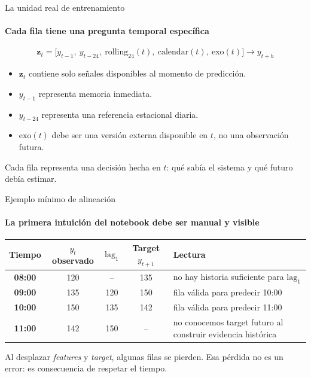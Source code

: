 \documentclass[aspectratio=169,11pt]{beamer}  %
\newcommand{\hrow}{\rowcolor{mlcream}}
\begin{document}

\begin{frame}{La unidad real de entrenamiento}
\framesubtitle{Cada fila tiene una pregunta temporal específica}
{\Large\[ \mathbf{z}_t = \bigl[y_{t-1},\ y_{t-24},\ \mathrm{rolling}_{24}(t),\ \mathrm{calendar}(t),\ \mathrm{exo}(t)\bigr] \longrightarrow y_{t+h} \]}
\begin{itemize}
\item $\mathbf{z}_t$ contiene solo señales disponibles al momento de predicción.
\item $y_{t-1}$ representa memoria inmediata.
\item $y_{t-24}$ representa una referencia estacional diaria.
\item $\mathrm{exo}(t)$ debe ser una versión externa disponible en $t$, no una observación futura.
\end{itemize}
Cada fila representa una decisión hecha en $t$: qué sabía el sistema y qué futuro debía estimar.
\end{frame}

\begin{frame}{Ejemplo mínimo de alineación}
\framesubtitle{La primera intuición del notebook debe ser manual y visible}
\centering
\begin{tabular}{@{}c c c c P{0.36\textwidth}@{}}
\toprule
\hrow \textbf{Tiempo} & $y_t$ observado & $\mathrm{lag}_1$ & Target $y_{t+1}$ & Lectura\\
\midrule
\textbf{08:00} & 120 & -- & 135 & no hay historia suficiente para $\mathrm{lag}_1$\\
\textbf{09:00} & 135 & 120 & 150 & fila válida para predecir 10:00\\
\textbf{10:00} & 150 & 135 & 142 & fila válida para predecir 11:00\\
\textbf{11:00} & 142 & 150 & -- & no conocemos target futuro al construir evidencia histórica\\
\bottomrule
\end{tabular}

\vspace{1.5em}
Al desplazar \emph{features} y \emph{target}, algunas filas se pierden. Esa pérdida no es un error: es consecuencia de respetar el tiempo.
\end{frame}
\end{document}
